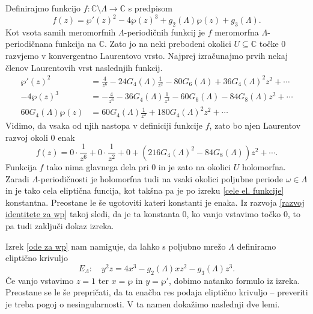 \documentclass[mat1]{fmfdelo}
\newcommand{\C}{\mathbb C}
\newcommand{\om}{\omega}
\theoremstyle{definition}
\begin{document}
\begin{dokaz}
    Definirajmo funkcijo $f:\C\setminus\Lambda \to \C$ s predpisom
    \[
        f(z) = \wp'(z)^2 - 4\wp(z)^3 + g_2(\Lambda)\wp(z) + g_3(\Lambda).
    \]
    Kot vsota samih meromorfnih $\Lambda$-periodičnih funkcij je $f$ meromorfna $\Lambda$-periodičnana funkcija na $\C$. Zato jo na neki prebodeni okolici $U \subseteq \C$ točke $0$ razvjemo v konvergentno Laurentovo vrsto. Najprej izračunajmo prvih nekaj členov Laurentovih vrst naslednjih funkcij.
    \begin{align*}
        \wp'(z)^2 &= \frac{4}{z^6} - 24G_4(\Lambda)\frac{1}{z^2} - 80G_6(\Lambda) + 36G_4(\Lambda)^2z^2 + \cdots \\
        -4\wp(z)^3 &= -\frac{4}{z^6} - 36G_4(\Lambda) \frac{1}{z^2} - 60G_6(\Lambda) - 84G_8(\Lambda)z^2 + \cdots \\
        60G_4(\Lambda)\wp(z) &= 60G_4(\Lambda)\frac{1}{z^2} + 180G_4(\Lambda)^2z^2 + \cdots  
    \end{align*}
    Vidimo, da vsaka od njih nastopa v definiciji funkcije $f$, zato bo njen Laurentov razvoj okoli $0$ enak
    \begin{equation}
        \label{razvoj identitete za wp}    
        f(z) = 0 \cdot \frac{1}{z^6} + 0 \cdot \frac{1}{z^2} + 0 + (216G_4(\Lambda)^2 - 84G_8(\Lambda))z^2 + \cdots.
    \end{equation}
    Funkcija $f$ tako nima glavnega dela pri $0$ in je zato na okolici $U$ holomorfna. Zaradi $\Lambda$-periodičnosti je holomorfna tudi na vsaki okolici poljubne periode $\om\in\Lambda$ in je tako cela eliptična funcija, kot takšna pa je po izreku \ref{cele el. funkcije} konstantna. Preostane le še ugotoviti kateri konstanti je enaka. Iz razvoja \ref{razvoj identitete za wp} takoj sledi, da je ta konstanta $0$, ko vanjo vstavimo točko $0$, to pa tudi zaključi dokaz izreka.
\end{dokaz}

Izrek \ref{ode za wp} nam namiguje, da lahko s poljubno mrežo $\Lambda$ definiramo eliptično krivuljo
\begin{equation}
    \label{elipticna krivulja glede na mrezo}    
    E_\Lambda : \quad y^2 z = 4x^3 - g_2(\Lambda)x z^2 - g_3(\Lambda) z^3.
\end{equation}
Če vanjo vstavimo $z = 1$ ter $x = \wp$ in $y = \wp'$, dobimo natanko formulo iz izreka. Preostane se le še prepričati, da ta enačba res podaja eliptično krivuljo -- preveriti je treba pogoj o nesingularnosti. V ta namen dokažimo naslednji dve lemi.
\end{document}
